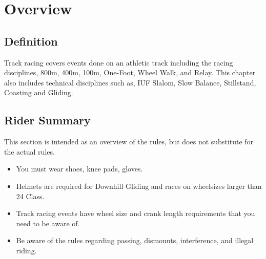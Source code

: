 \chapter{Overview}

\section{Definition}

Track racing covers events done on an athletic track including the racing disciplines, 800m, 400m, 100m, One-Foot, Wheel Walk, and Relay.
This chapter also includes technical disciplines such as, IUF Slalom, Slow Balance, Stillstand, Coasting and Gliding.

\section{Rider Summary}

This section is intended as an overview of the rules, but does not substitute for the actual rules.
\begin{itemize}
  \item You must wear shoes, knee pads, gloves.
  \item Helmets are required for Downhill Gliding and races on wheelsizes larger than 24 Class.
  \item Track racing events have wheel size and crank length requirements that you need to be aware of.
  \item Be aware of the rules regarding passing, dismounts, interference, and illegal riding.
\end{itemize}
